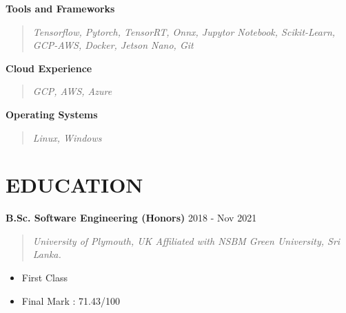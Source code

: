\documentclass[mm]{res} %
\begin{document}
\begin{resume}
\textbf{Tools and Frameworks}
\begin{quote}
	\emph{Tensorflow, Pytorch, TensorRT, Onnx, Jupytor Notebook, Scikit-Learn, GCP-AWS, Docker, Jetson Nano, Git}
	\end{quote}

\textbf{Cloud Experience}
	\begin{quote}
		\emph{GCP, AWS, Azure}
		\end{quote}

\textbf{Operating Systems}
\begin{quote}
	\emph{Linux, Windows}
	\end{quote} 



\section{EDUCATION}


\textbf{B.Sc. Software Engineering (Honors)} \hfill 2018 - Nov 2021
\begin{quote}
\emph{University of Plymouth, UK Affiliated with NSBM Green University, Sri Lanka.}
\end{quote}

\begin{itemize} \itemsep -1pt %
\item First Class
\item Final Mark : 71.43/100
\end{itemize}

%


\end{resume}
\end{document}

